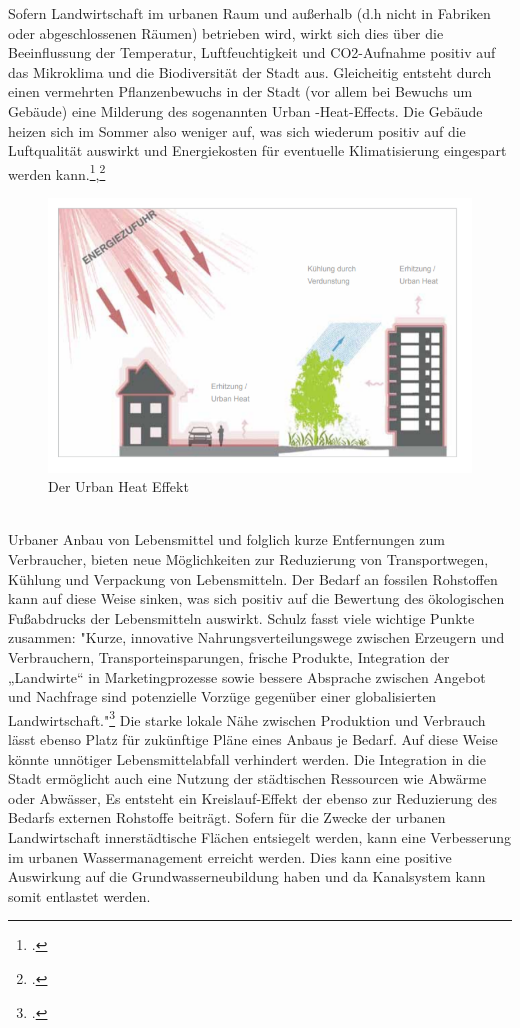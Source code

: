 \documentclass{scrartcl}
\begin{document}
Sofern Landwirtschaft im urbanen Raum und außerhalb (d.h nicht in Fabriken oder abgeschlossenen Räumen) betrieben wird, wirkt sich dies über die Beeinflussung der Temperatur, Luftfeuchtigkeit und CO2-Aufnahme positiv auf das Mikroklima und die Biodiversität der Stadt aus.
Gleicheitig entsteht durch einen vermehrten Pflanzenbewuchs in der Stadt (vor allem bei Bewuchs um Gebäude) eine Milderung des sogenannten Urban -Heat-Effects. Die Gebäude heizen sich im Sommer also weniger auf, was sich wiederum positiv auf die Luftqualität auswirkt und Energiekosten für eventuelle Klimatisierung eingespart werden kann.\footcite{Schulz2013UrbaneLandmanagements},\footcite[Vgl.][S.16]{Spring2012DerBasel-Stadt}

\begin{figure}[htbp]
\centering
\includegraphics[width=14cm]{image_folder/urbanheat.png}
\caption{Der Urban Heat Effekt}
\label{fig:urbanheateffekt}
\end{figure}
\\

Urbaner Anbau von Lebensmittel und folglich kurze Entfernungen zum Verbraucher, bieten neue Möglichkeiten zur Reduzierung von Transportwegen, Kühlung und Verpackung von Lebensmitteln. Der Bedarf an fossilen Rohstoffen kann auf diese Weise sinken, was sich positiv auf die Bewertung des ökologischen Fußabdrucks der Lebensmitteln auswirkt. Schulz fasst viele wichtige Punkte zusammen: "Kurze, innovative Nahrungsverteilungswege zwischen Erzeugern und Verbrauchern, Transporteinsparungen, frische Produkte, Integration der „Landwirte“ in Marketingprozesse sowie bessere Absprache zwischen Angebot und Nachfrage sind potenzielle Vorzüge gegenüber einer globalisierten Landwirtschaft."\footcite[S.10]{Schulz2013UrbaneLandmanagements} Die starke lokale Nähe zwischen Produktion und Verbrauch lässt ebenso Platz für zukünftige Pläne eines Anbaus je Bedarf. Auf diese Weise könnte unnötiger Lebensmittelabfall verhindert werden. Die Integration in die Stadt ermöglicht auch eine Nutzung der städtischen Ressourcen wie Abwärme oder Abwässer, Es entsteht ein Kreislauf-Effekt der ebenso zur Reduzierung des Bedarfs externen Rohstoffe beiträgt.
Sofern für die Zwecke der urbanen Landwirtschaft innerstädtische Flächen entsiegelt werden, kann eine Verbesserung im urbanen Wassermanagement erreicht werden. Dies kann eine positive Auswirkung auf die Grundwasserneubildung haben und da Kanalsystem kann somit entlastet werden.  
  
\end{document}
